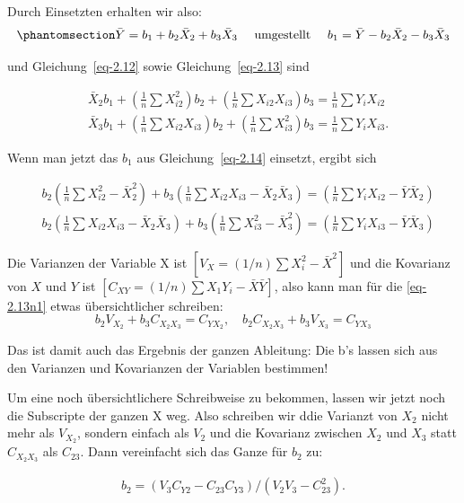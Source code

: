 \documentclass[
  10pt,
  letterpaper,
  a4paper, twoside]{scrreprt}
\begin{document}
\begin{tcolorbox}
Durch Einsetzten erhalten wir also:
\begin{equation}\phantomsection\label{eq-2.14}{
\bar{Y}=b_1+b_2 \bar{X}_2+b_3 \bar{X}_3 \quad \text { umgestellt } \quad b_1=\bar{Y}-b_2 \bar{X}_2-b_3 \bar{X}_3
}\end{equation}

und Gleichung~\ref{eq-2.12} sowie Gleichung~\ref{eq-2.13} sind

\begin{align}
& \bar{X}_2 b_1+\left(\frac{1}{n} \sum X_{i 2}^2\right) b_2+\left(\frac{1}{n} \sum X_{i 2} X_{i 3}\right) b_3=\frac{1}{n} \sum Y_i X_{i 2} \label{eq-2.12}\\
& \bar{X}_3 b_1+\left(\frac{1}{n} \sum X_{i 2} X_{i 3}\right) b_2+\left(\frac{1}{n} \sum X_{i 3}^2\right) b_3=\frac{1}{n} \sum Y_i X_{i 3} . \label{eq-2.13b}
\end{align}

Wenn man jetzt das \(b_1\) aus Gleichung~\ref{eq-2.14} einsetzt, ergibt
sich

\begin{align}
& b_2\left(\frac{1}{n} \sum X_{i 2}^2-\bar{X}_2^2\right)+b_3\left(\frac{1}{n} \sum X_{i 2} X_{i 3}-\bar{X}_2 \bar{X}_3\right)=\left(\frac{1}{n} \sum Y_i X_{i 2}-\bar{Y} \bar{X}_2\right) \\
& b_2\left(\frac{1}{n} \sum X_{i 2} X_{i 3}-\bar{X}_2 \bar{X}_3\right)+b_3\left(\frac{1}{n} \sum X_{i 3}^2-\bar{X}_3^2\right)=\left(\frac{1}{n} \sum Y_i X_{i 3}-\bar{Y} \bar{X}_3\right) \label{eq-2.13n1}
\end{align}

Die Varianzen der Variable X ist
\(\left[V_X=(1 / n) \sum X_i^2-\bar{X}^2\right]\) und die Kovarianz von
\(X\) und \(Y\) ist
\(\left[C_{X Y}=(1 / n) \sum X_1 Y_i-\bar{X} \bar{Y}\right]\), also kann
man für die \eqref{eq-2.13n1} etwas übersichtlicher schreiben: \[
b_2 V_{X_2}+b_3 C_{X_2 X_3}=C_{Y X_2}, \quad b_2 C_{X_2 X_3}+b_3 V_{X_3}=C_{Y X_3}
\]

Das ist damit auch das Ergebnis der ganzen Ableitung: Die b's lassen
sich aus den Varianzen und Kovarianzen der Variablen bestimmen!

Um eine noch übersichtlichere Schreibweise zu bekommen, lassen wir jetzt
noch die Subscripte der ganzen X weg. Also schreiben wir ddie Varianzt
von \(X_2\) nicht mehr als \(V_{X_2}\), sondern einfach als \(V_2\) und
die Kovarianz zwischen \(X_2\) und \(X_3\) statt \(C_{X_2 X_3}\) als
\(C_{2 3}\). Dann vereinfacht sich das Ganze für \(b_2\) zu:

\begin{align}
b_2=\left(V_3 C_{Y 2}-C_{23} C_{Y 3}\right) /\left(V_2 V_3-C_{23}^2\right) . \label{eq-2.15}
\end{align}


\end{tcolorbox}
\end{document}
